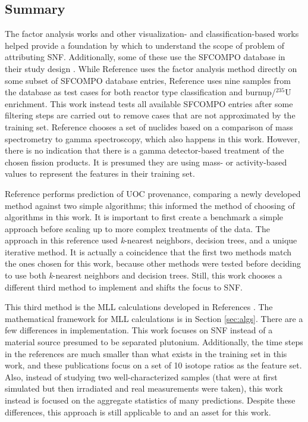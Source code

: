 \subsection{Summary}

The factor analysis works \cite{nicolaou_2006, nicolaou_pu, nicolaou_2009,
nicolaou_2014, nicolaou_2015} and other visualization- and classification-based
works \cite{pu_discrimination, jones_snf_2014, jones_viz_2014} helped provide a
foundation by which to understand the scope of problem of attributing
\gls{SNF}. Additionally, some of these use the \gls{SFCOMPO} database in their
study design \cite{nicolaou_2014, jones_viz_2014}. While Reference
\cite{nicolaou_2014} uses the factor analysis method directly on some subset of
\gls{SFCOMPO} database entries, Reference \cite{jones_viz_2014} uses nine
samples from the database as test cases for both reactor type classification
and burnup/${}^{235}\text{U}$ enrichment.  This work instead tests all
available \gls{SFCOMPO} entries after some filtering steps are carried out to
remove cases that are not approximated by the training set.  Reference
\cite{nicolaou_2009} chooses a set of nuclides based on a comparison of mass
spectrometry to gamma spectroscopy, which also happens in this work. However,
there is no indication that there is a gamma detector-based treatment of the
chosen fission products. It is presumed they are using mass- or activity-based
values to represent the features in their training set. 

Reference \cite{robel_2009} performs prediction of \gls{UOC} provenance,
comparing a newly developed method against two simple algorithms; this informed
the method of choosing of algorithms in this work. It is important to first
create a benchmark a simple approach before scaling up to more complex
treatments of the data. The approach in this reference used \textit{k}-nearest
neighbors, decision trees, and a unique iterative method.  It is actually a
coincidence that the first two methods match the ones chosen for this work,
because other methods were tested before deciding to use both
\textit{k}-nearest neighbors and decision trees. Still, this work chooses a
different third method to implement and shifts the focus to \gls{SNF}. 

This third method is the \gls{MLL} calculations developed in References
\cite{mll_method, mll_validate, mll_sensitivity}.  The mathematical framework
for \gls{MLL} calculations is in Section \ref{sec:algs}.  There are a few
differences in implementation. This work focuses on \gls{SNF} instead of a
material source presumed to be separated plutonium.  Additionally, the time
steps in the references are much smaller than what exists in the training set
in this work, and these publications focus on a set of 10 isotope ratios as the
feature set.  Also, instead of studying two well-characterized samples (that
were at first simulated but then irradiated and real measurements were taken),
this work instead is focused on the aggregate statistics of many predictions.
Despite these differences, this approach is still applicable to and an asset
for this work. 

